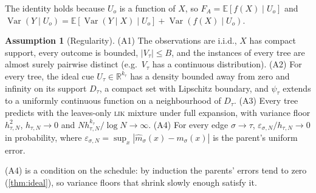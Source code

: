 \documentclass[11pt]{article}
\theoremstyle{definition}
\newtheorem{assumption}[theorem]{Assumption}
\theoremstyle{remark}
\newcommand{\R}{\mathbb{R}}
\newcommand{\E}{\mathbb{E}}
\newcommand{\Var}{\operatorname{Var}}
\begin{document}
The identity holds because $U_o$ is a function of $X$, so $F_A=\E[f(X)\mid U_o]$ and
$\Var(Y\mid U_o)=\E[\Var(Y\mid X)\mid U_o]+\Var(f(X)\mid U_o)$.

\begin{assumption}[Regularity]\label{ass:regular}
(A1) The observations are i.i.d., $X$ has compact support, every outcome is bounded,
$|V_\tau|\le B$, and the instances of every tree are almost surely pairwise distinct
(e.g.\ $V_\tau$ has a continuous distribution).  (A2) For every tree, the ideal cue
$U_\tau\in\R^{k_\tau}$ has a density bounded away from zero and infinity on its support
$D_\tau$, a compact set with Lipschitz boundary, and $\psi_\tau$ extends to a uniformly
continuous function on a neighbourhood of $D_\tau$.  (A3) Every tree predicts with the leaves-only \textsc{lik}
mixture under full expansion, with variance floor $h_{\tau,N}^2$, $h_{\tau,N}\to0$ and
$Nh_{\tau,N}^{k_\tau}/\log N\to\infty$.  (A4) For every edge $\sigma\to\tau$,
$\varepsilon_{\sigma,N}/h_{\tau,N}\to0$ in probability, where
$\varepsilon_{\sigma,N}=\sup_x|\hat m_\sigma(x)-m_\sigma(x)|$ is the parent's uniform
error.
\end{assumption}

(A4) is a condition on the schedule: by induction the parents' errors tend to zero
(\cref{thm:ideal}), so variance floors that shrink slowly enough satisfy it.
\end{document}
